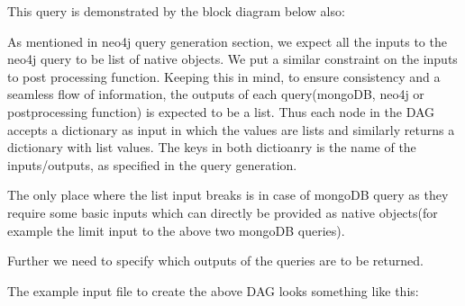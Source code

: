\documentclass[letterpaper,10pt,english]{sphinxmanual}
\begin{document}
This query is demonstrated by the block diagram below also:

\noindent{}

As mentioned in neo4j query generation section, we expect all the inputs to the neo4j query to be  list of native objects. We put a similar constraint on the inputs to post processing function. Keeping this in mind, to ensure consistency and a seamless flow of information, the outputs of each query(mongoDB, neo4j or postprocessing function) is expected to be a list. Thus each node in the DAG accepts a dictionary as input in which the values are lists and similarly returns a dictionary with list values. The keys in both dictioanry is the name of the inputs/outputs, as specified in the query generation.

The only place where the list input breaks is in case of mongoDB query as they require some basic inputs which can directly be provided as native objects(for example the limit input to the above two mongoDB queries).

Further we need to specify which outputs of the queries are to be returned.

The example input file to create the above DAG looks something like this:

%
\begin{sphinxVerbatim}[commandchars=\\\{\}]
 
 
 
 
 
\end{sphinxVerbatim}
\end{document}
